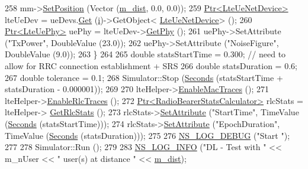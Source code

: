 \begin{DoxyCode}
258       mm->\hyperlink{classns3_1_1MobilityModel_ac584b3d5a309709d2f13ed6ada1e7640}{SetPosition} (Vector (\hyperlink{classLenaTdBetFfMacSchedulerTestCase1_a26e6b63863876e36787b091974bbdb9a}{m\_dist}, 0.0, 0.0));
259       \hyperlink{classns3_1_1Ptr}{Ptr<LteUeNetDevice>} lteUeDev = ueDevs.\hyperlink{classns3_1_1NetDeviceContainer_a677d62594b5c9d2dea155cc5045f4d0b}{Get} (\hyperlink{bernuolliDistribution_8m_a6f6ccfcf58b31cb6412107d9d5281426}{i})->GetObject<
      \hyperlink{classns3_1_1LteUeNetDevice}{LteUeNetDevice}> ();
260       \hyperlink{classns3_1_1Ptr}{Ptr<LteUePhy>} uePhy = lteUeDev->\hyperlink{classns3_1_1LteUeNetDevice_a2a9940a1e457a8bf3dae87fed4199c7a}{GetPhy} ();
261       uePhy->SetAttribute (\textcolor{stringliteral}{"TxPower"}, DoubleValue (23.0));
262       uePhy->SetAttribute (\textcolor{stringliteral}{"NoiseFigure"}, DoubleValue (9.0));
263     \}
264 
265   \textcolor{keywordtype}{double} statsStartTime = 0.300; \textcolor{comment}{// need to allow for RRC connection establishment + SRS}
266   \textcolor{keywordtype}{double} statsDuration = 0.6;
267   \textcolor{keywordtype}{double} tolerance = 0.1;
268   Simulator::Stop (\hyperlink{group__timecivil_ga33c34b816f8ff6628e33d5c8e9713b9e}{Seconds} (statsStartTime + statsDuration - 0.000001));
269 
270   lteHelper->\hyperlink{classns3_1_1LteHelper_affa3a12841520407d3662417fe41863d}{EnableMacTraces} ();
271   lteHelper->\hyperlink{classns3_1_1LteHelper_abadfdd04d30b261e9b6f0846b4784928}{EnableRlcTraces} ();
272   \hyperlink{classns3_1_1Ptr}{Ptr<RadioBearerStatsCalculator>} rlcStats = lteHelper->
      \hyperlink{classns3_1_1LteHelper_a6eb438ccf69642e3863adea4991fa2ca}{GetRlcStats} ();
273   rlcStats->\hyperlink{classns3_1_1ObjectBase_ac60245d3ea4123bbc9b1d391f1f6592f}{SetAttribute} (\textcolor{stringliteral}{"StartTime"}, TimeValue (\hyperlink{group__timecivil_ga33c34b816f8ff6628e33d5c8e9713b9e}{Seconds} (statsStartTime)));
274   rlcStats->\hyperlink{classns3_1_1ObjectBase_ac60245d3ea4123bbc9b1d391f1f6592f}{SetAttribute} (\textcolor{stringliteral}{"EpochDuration"}, TimeValue (\hyperlink{group__timecivil_ga33c34b816f8ff6628e33d5c8e9713b9e}{Seconds} (statsDuration)));
275 
276   \hyperlink{group__logging_ga413f1886406d49f59a6a0a89b77b4d0a}{NS\_LOG\_DEBUG} (\textcolor{stringliteral}{"Start "});
277 
278   Simulator::Run ();
279 
283   \hyperlink{group__logging_gafbd73ee2cf9f26b319f49086d8e860fb}{NS\_LOG\_INFO} (\textcolor{stringliteral}{"DL - Test with "} << m\_nUser << \textcolor{stringliteral}{" user(s) at distance "} << 
      \hyperlink{classLenaTdBetFfMacSchedulerTestCase1_a26e6b63863876e36787b091974bbdb9a}{m\_dist});

\end{DoxyCode}
